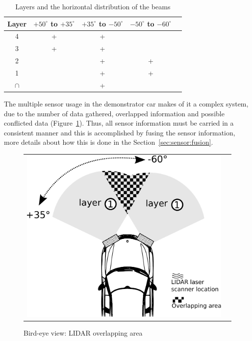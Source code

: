 \begin{table}
	\begin{center}
	    \begin{tabular}{ | c | c | c | c | c |}
		    \hline
		    Layer & $+50^\circ$ to $+35^\circ$ & $+35^\circ$ to $-50^\circ$ & $-50^\circ$ to $-60^\circ$ \\ \hline
		    4 & + & + &    \\ \hline
		    3 & + & + &    \\ \hline
		    2 &  & + & + \\ \hline
		    1 &  & + & + \\ \hline
		    $\cap$ &  & + &   \\ \hline
	    \end{tabular}
	\end{center}
    \caption{Layers and the horizontal distribution of the beams}
\label{tab:beam:interception}
\end{table}

The multiple sensor usage in the demonstrator car makes of it a complex system, due to the number of data gathered, overlapped information and possible conflicted data (Figure~\ref{fig:demonstrator:superior:overlap}). Thus, all sensor information must be carried in a consistent manner and this is accomplished by fusing the sensor information, more details about how this is done in the Section~\ref{sec:sensor:fusion}.

\begin{figure}[h]
   \centering
     \begin{tabular}{lr}
       \includegraphics[scale=0.5]{img/fig:demonstrator:superior:overlap}
     \end{tabular}
   \caption{Bird-eye view: LIDAR overlapping area}
   \label{fig:demonstrator:superior:overlap}
\end{figure}

